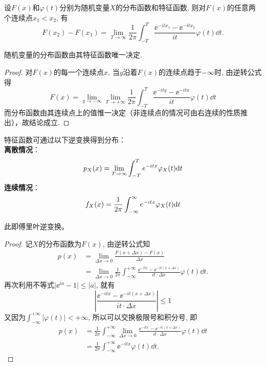 \begin{theorem}[逆转公式]
    设$F (x)$和$\varphi (t)$分别为随机变量$X$的分布函数和特征函数, 则对$F (x)$的任意两个连续点$x_1 < x_2$, 有
    \begin{equation}\label{eq:4.1.11}
        F (x_2) - F (x_1) = \lim_{T \to \infty} \frac{1}{2\pi} \int_{-T}^T \frac{\ee^{-itx_1}  - \ee^{-itx_2}}{it} \varphi (t) \dd t.
    \end{equation}
\end{theorem}

\begin{theorem}[唯一性定理]
    随机变量的分布函数由其特征函数唯一决定.
\end{theorem}
\begin{proof}
    对$F (x)$的每一个连续点$x$, 当$y$沿着$F (x)$的连续点趋于$-\infty$时, 由逆转公式得
    \[ F (x) = \lim_{y \to -\infty} \lim_{T \to +\infty} \frac{1}{2\pi} \int_{-T}^T \frac{\ee^{-ity} - \ee^{-itx}}{it} \varphi (t) \dd t \]
    而分布函数由其连续点上的值惟一决定（非连续点的情况可由右连续的性质推出），故结论成立.
\end{proof}

\begin{theorem}
    特征函数可通过以下逆变换得到分布：\\
    \textbf{离散情况}：
    \[ p_X(x)=\lim _{T \rightarrow \infty} \int_{-T}^{T} e^{-i t x} \varphi_X(t) \mathrm{d} t \]
    \textbf{连续情况}：
    \[ f_X(x)=\frac1{2 \pi} \int_{-\infty}^{\infty} e^{-i t x} \varphi_X(t) \mathrm{d} t \]
\end{theorem}
\begin{remark}
    此即傅里叶逆变换。
\end{remark}
\begin{proof}
    记$X$的分布函数为$F (x)$, 由逆转公式知
    \begin{align*}
        p (x) & = \lim_{\Delta x \to 0} \frac{F (x + \Delta x) - F (x)}{\Delta x}                                                                                  \\
              & = \lim_{\Delta x \to 0} \frac{1}{2\pi} \int_{-\infty}^{+\infty} \frac{\ee^{-itx} - \ee^{-it (x + \Delta x)}}{it \cdot \Delta x} \varphi (t) \dd t.
    \end{align*}
    再次利用不等式$\lvert \ee^{ia} - 1 \rvert \leq \lvert a \rvert$, 就有
    \[ \left\lvert \frac{\ee^{-itx} - \ee^{-it (x + \Delta x)}}{it \cdot \Delta x} \right\rvert \leq 1 \]
    又因为$\int_{-\infty}^{+\infty} \lvert \varphi (t) \rvert < +\infty$, 所以可以交换极限号和积分号, 即
    \begin{align*}
        p (x) & = \frac{1}{2\pi} \int_{-\infty}^{+\infty} \lim_{\Delta x \to 0} \frac{\ee^{-itx} - \ee^{-it (x + \Delta x)}}{it \cdot \Delta x} \varphi (t) \dd t \\
              & = \frac{1}{2\pi} \int_{-\infty}^{+\infty} \ee^{-itx} \varphi (t) \dd t.
    \end{align*}
\end{proof}


